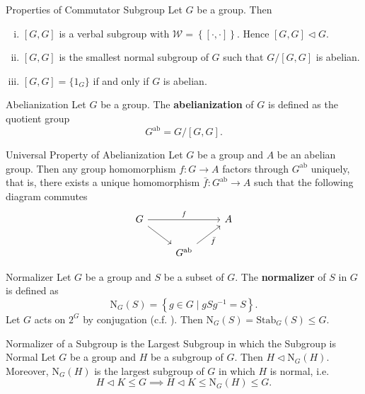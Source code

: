\begin{proposition}{Properties of Commutator Subgroup}{}
    Let $G$ be a group. Then
    \begin{enumerate}[(i)]
        \item $[G,G]$ is a verbal subgroup with $\mathcal{W}=\left\{ [\cdot,\cdot] \right\}$. Hence $[G,G]\lhd G$.
        \item $[G,G]$ is the smallest normal subgroup of $G$ such that $G/[G,G]$ is abelian.
        \item $[G,G]=\{1_G\}$ if and only if $G$ is abelian.
    \end{enumerate}
\end{proposition}


\begin{definition}{Abelianization}{}
    Let $G$ be a group. The \textbf{abelianization} of $G$ is defined as the quotient group
    $$
        G^{\mathrm{ab}}=G/[G,G].
    $$
\end{definition}

\begin{proposition}{Universal Property of Abelianization}{}
    Let $G$ be a group and $A$ be an abelian group. Then any group homomorphism $f:G\to A$ factors through $G^{\mathrm{ab}}$ uniquely, that is, there exists a unique homomorphism $\bar{f}:G^{\mathrm{ab}}\to A$ such that the following diagram commutes
    $$
        \begin{tikzcd}[ampersand replacement=\&]
            G \arrow[rr, "f"] \arrow[rd] \&  \& A \\
            \& G^{\mathrm{ab}} \arrow[ru, "\bar{f}"'] \&
        \end{tikzcd}
    $$
\end{proposition}

\begin{definition}{Normalizer}{}
    Let $G$ be a group and $S$ be a subset of $G$. The \textbf{normalizer} of $S$ in $G$ is defined as
    $$
        \mathrm{N}_G(S)=\left\{ g\in G\mid gSg^{-1}=S \right\}.
    $$
    Let $G$ acts on $2^G$ by conjugation (c.f. ). Then $\mathrm{N}_G(S)=\mathrm{Stab}_G(S)\le G$.
\end{definition}

\begin{proposition}{Normalizer of a Subgroup is the Largest Subgroup in which the Subgroup is Normal}{}
    Let $G$ be a group and $H$ be a subgroup of $G$. Then $H\lhd\mathrm{N}_G(H)$. Moreover, $\mathrm{N}_G(H)$ is the largest subgroup of $G$ in which $H$ is normal, i.e. $$H\lhd K\le G\implies H\lhd K\le \mathrm{N}_G(H)\le G.$$
\end{proposition}

